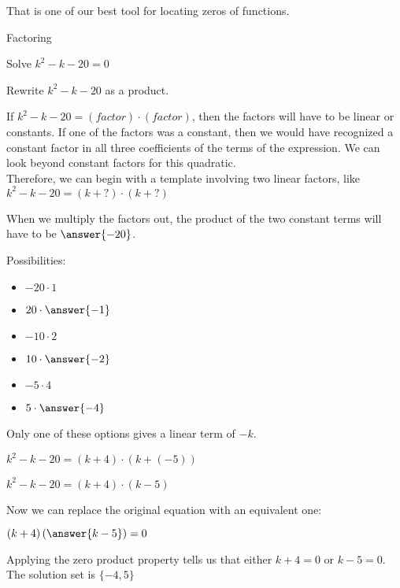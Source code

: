 \documentclass{ximera}
\begin{document}
That is one of our best tool for locating zeros of functions. \\



\begin{example} Factoring

Solve $k^2 - k - 20 = 0$ \\

\begin{explanation}



Rewrite $k^2 - k - 20$ as a product.

If $k^2 - k - 20 = (factor) \cdot (factor)$, then the factors will have to be linear or constants.  If one of the factors was a constant, then we would have recognized a constant factor in all three coefficients of the terms of the expression.  We can look beyond constant factors for this quadratic. \\

Therefore, we can begin with a template involving two linear factors, like $k^2 - k - 20 = (k + ?) \cdot (k + ?)$

When we multiply the factors out, the product of the two constant terms will have to be $\answer{-20}$.

Possibilities:
\begin{itemize}
\item $-20 \cdot 1$
\item $20 \cdot \answer{-1}$
\item $-10 \cdot 2$
\item $10 \cdot \answer{-2}$
\item $-5 \cdot 4$
\item $5 \cdot \answer{-4}$
\end{itemize}



Only one of these options gives a linear term of $-k$.


$k^2 - k - 20 = (k + 4) \cdot (k + (-5))$

$k^2 - k - 20 = (k + 4) \cdot (k - 5)$



Now we can replace the original equation with an equivalent one:


$(k + 4) \left( \answer{k - 5} \right) = 0$



Applying the zero product property tells us that either $k + 4 = 0$ or $k - 5 = 0$.  \\

The solution set is $\{ -4, 5 \}$



\end{explanation}

\end{example}
\end{document}
